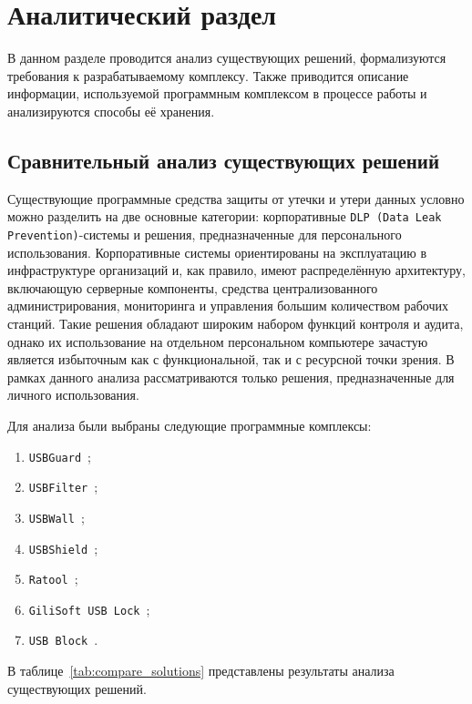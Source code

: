 \chapter{Аналитический раздел}

В данном разделе проводится анализ существующих решений,
формализуются требования к разрабатываемому комплексу. Также приводится описание информации, 
используемой программным комплексом в процессе работы и анализируются способы её хранения.

\section{Сравнительный анализ существующих решений}

Существующие программные средства защиты от утечки и утери данных условно можно разделить на две основные категории: 
корпоративные \texttt{DLP (Data Leak Prevention)}-системы и решения, предназначенные для персонального использования. 
Корпоративные системы ориентированы на эксплуатацию в инфраструктуре организаций и, как правило, имеют распределённую 
архитектуру, включающую серверные компоненты, средства централизованного администрирования, мониторинга и 
управления большим количеством рабочих станций. Такие решения обладают широким набором функций контроля и аудита, 
однако их использование на отдельном персональном компьютере зачастую является избыточным как с функциональной, 
так и с ресурсной точки зрения. В рамках данного анализа рассматриваются только решения, предназначенные для личного использования. 

Для анализа были выбраны следующие программные комплексы:

\begin{enumerate}
    \item \texttt{USBGuard}~\cite{USBGuard};
    \item \texttt{USBFilter}~\cite{USBFilter};
    \item \texttt{USBWall}~\cite{USBWall};
    \item \texttt{USBShield}~\cite{USBShield};
    \item \texttt{Ratool}~\cite{Ratool};
    \item \texttt{GiliSoft USB Lock}~\cite{GilisoftUSBLock};
    \item \texttt{USB Block}~\cite{USBBlock}.
\end{enumerate}

В таблице~\ref{tab:compare_solutions} представлены результаты анализа существующих решений.


